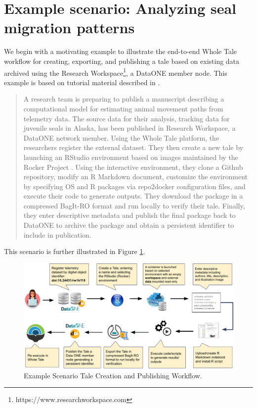\documentclass[conference]{IEEEtran}
\begin{document}
\section{Example scenario: Analyzing seal migration patterns} \label{scenario}
We begin with a motivating example to illustrate the end-to-end Whole Tale workflow for creating, exporting, and publishing a tale based on existing data archived using the Research Workspace\footnote{https://www.researchworkspace.com}, a DataONE member node. This example is based on tutorial material described in \cite{london2018}.

\begin{quote}
A research team is preparing to publish a manuscript describing a computational model for 
estimating animal movement paths from telemetry data. The source data for their analysis, 
tracking data for juvenile seals in Alaska\cite{cameron2018}, has been published in Research 
Workspace, a DataONE network member. Using the Whole Tale platform, the researchers register the 
external dataset. They then create a new tale by launching an RStudio environment based on 
images maintained by the Rocker Project \cite{boettiger2018}. Using the interactive environment, 
they clone a Github repository, modify an R Markdown document, customize the environment by 
specifying OS and R packages via repo2docker configuration files, and execute their code to 
generate outputs. They download the package in a compressed BagIt-RO format and run locally to 
verify their tale. Finally, they enter descriptive metadata and publish the final 
package back to DataONE to archive the package and obtain a persistent identifier to include in publication. 
\end{quote}

This scenario is further illustrated in Figure \ref{workflow}.


\begin{figure}
\centering
\includegraphics[scale=0.6]{images/wholetale-workflow.pdf}
\caption{Example Scenario Tale Creation and Publishing Workflow.}
\label{workflow}
\end{figure}
\end{document}
